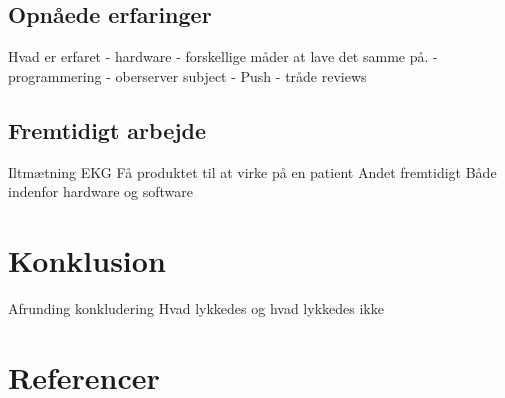 \section{Opnåede erfaringer}
Hvad er erfaret
 - hardware
 	- forskellige måder at lave det samme på.
 - programmering
 	- oberserver subject
 	- Push
 	- tråde
reviews
\section{Fremtidigt arbejde}
Iltmætning
EKG
Få produktet til at virke på en patient
Andet fremtidigt
Både indenfor hardware og software
\chapter{Konklusion}
Afrunding
konkludering
Hvad lykkedes og hvad lykkedes ikke
\chapter{Referencer}